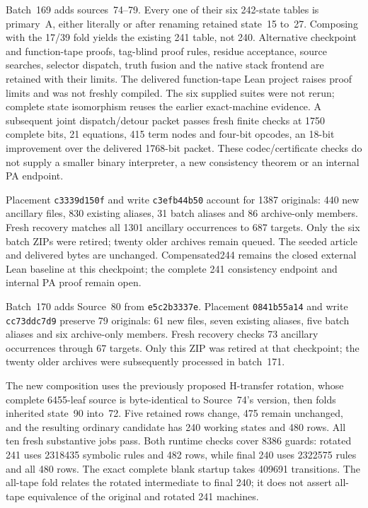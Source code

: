 \documentclass[11pt]{article}
\begin{document}
{Batch~169 adds sources~74--79. Every one of their six 242-state tables is
primary~A, either literally or after renaming retained state~15 to~27.
Composing with the 17/39 fold yields the existing 241 table, not 240.
Alternative checkpoint and function-tape proofs, tag-blind proof rules,
residue acceptance, source searches, selector dispatch, truth fusion and
the native stack frontend are retained with their limits. The delivered
function-tape Lean project raises proof limits and was not freshly compiled.
The six supplied suites were not rerun; complete state isomorphism reuses
the earlier exact-machine evidence. A subsequent joint dispatch/detour
packet passes fresh finite checks at 1750 complete bits, 21 equations,
415 term nodes and four-bit opcodes, an 18-bit improvement over the delivered
1768-bit packet. These codec/certificate checks do not supply a smaller binary
interpreter, a new consistency theorem or an internal PA endpoint.

Placement \texttt{c3339d150f} and write \texttt{c3efb44b50} account for 1387
originals: 440 new ancillary files, 830 existing aliases, 31 batch aliases
and 86 archive-only members. Fresh recovery matches all 1301 ancillary
occurrences to 687 targets. Only the six batch ZIPs were retired; twenty
older archives remain queued. The seeded article and delivered bytes are
unchanged. Compensated244 remains the closed external Lean baseline at this
checkpoint; the complete 241 consistency endpoint and internal PA proof
remain open.


Batch~170 adds Source~80 from \texttt{e5c2b3337e}. Placement
\texttt{0841b55a14} and write \texttt{cc73ddc7d9} preserve 79 originals:
61 new files, seven existing aliases, five batch aliases and six archive-only
members. Fresh recovery checks 73 ancillary occurrences through 67 targets.
Only this ZIP was retired at that checkpoint; the twenty older archives
were subsequently processed in batch~171.

The new composition uses the previously proposed H-transfer rotation,
whose complete 6455-leaf source is byte-identical to Source~74's version,
then folds inherited state~90 into~72. Five retained rows change, 475 remain
unchanged, and the resulting ordinary candidate has 240 working states and
480 rows. All ten fresh substantive jobs pass. Both runtime checks cover
8386 guards: rotated 241 uses 2318435 symbolic rules and 482 rows, while
final 240 uses 2322575 rules and all 480 rows. The exact complete blank
startup takes 409691 transitions. The all-tape fold relates the rotated
intermediate to final 240; it does not assert all-tape equivalence of the
original and rotated 241 machines.

}
\end{document}
